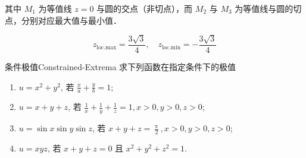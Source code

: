 \begin{solution}
    其中 $M_1$ 为等值线 $z=0$ 与圆的交点（非切点），而 $M_2$ 与 $M_3$ 为等值线与圆的切点，分别对应最大值与最小值．

    \begin{equation}
        \boxed{z_{\text{loc.max}} = \frac{3\sqrt{3}}{4}, \quad z_{\text{loc.min}} = -\frac{3\sqrt{3}}{4}}
    \end{equation}
\end{solution}


\begin{problem}{条件极值}{Constrained-Extrema}
    求下列函数在指定条件下的极值
    \begin{enumerate}
        \item $u = x^{2} + y^{2}$, 若 $\frac{x}{a} + \frac{y}{b} = 1$;
        \item $u = x + y + z$, 若 $\frac{1}{x} + \frac{1}{y} + \frac{1}{z} = 1, x > 0, y > 0, z > 0$;
        \item $u = \sin x \sin y \sin z$, 若 $x + y + z = \frac{\uppi}{2}, x > 0, y > 0, z > 0$;
        \item $u = x y z$, 若 $x + y + z = 0$ 且 $x^{2} + y^{2} + z^{2} = 1$.
    \end{enumerate}
\end{problem}

